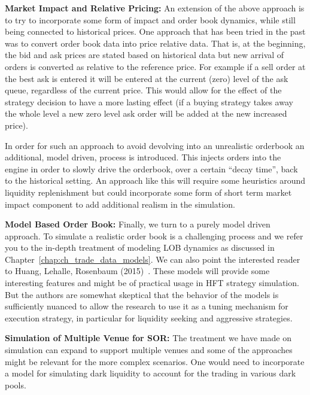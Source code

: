 \noindent\textbf{Market Impact and Relative Pricing:} An extension of the above approach is to try to incorporate some form of impact and order book dynamics, while still being connected to historical prices. One approach that has been tried in the past was to convert order book data into price relative data. That is, at the beginning, the bid and ask prices are stated based on historical data but new arrival of orders is converted as relative to the reference price. For example if a sell order at the best ask is entered it will be entered at the current (zero) level of the ask queue, regardless of the current price. This would allow for the effect of the strategy decision to have a more lasting effect (if a buying strategy takes away the whole level a new zero level ask order will be added at the new increased price). 


In order for such an approach to avoid devolving into an unrealistic orderbook an additional, model driven, process is introduced. This injects orders into the engine in order to slowly drive the orderbook, over a certain ``decay time'', back to the historical setting. An approach like this will require some heuristics around liquidity replenishment but could incorporate some form of short term market impact component to add additional realism in the simulation. \twomedskip


\noindent\textbf{Model Based Order Book:} Finally, we turn to a purely model driven approach. To simulate a realistic order book is a challenging process and we refer you to the in-depth treatment of modeling LOB dynamics as discussed in Chapter~\ref{chap:ch_trade_data_models}. We can also point the interested reader to Huang, Lehalle, Rosenbaum (2015)~\cite{hlehros}. These models will provide some interesting features and might be of practical usage in HFT strategy simulation. But the authors are somewhat skeptical that the behavior of the models is sufficiently nuanced to allow the research to use it as a tuning mechanism for execution strategy, in particular for liquidity seeking and aggressive strategies. \twomedskip


\noindent\textbf{Simulation of Multiple Venue for SOR:} The treatment we have made on simulation can expand to support multiple venues and some of the approaches might be relevant for the more complex scenarios. One would need to incorporate a model for simulating dark liquidity to account for the trading in various dark pools. \twomedskip


\noindent{} \twomedskip


